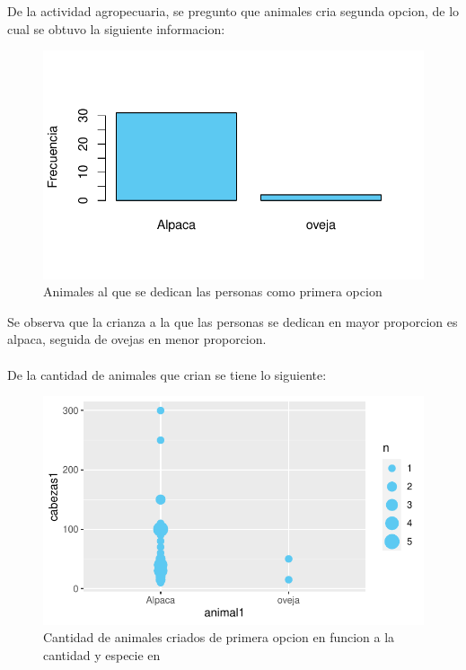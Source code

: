 \documentclass[12pt]{article}\usepackage[]{graphicx}\usepackage[]{xcolor}
\makeatletter
\def\maxwidth{ %
  \ifdim\Gin@nat@width>\linewidth
    \linewidth
  \else
    \Gin@nat@width
  \fi
}
\newenvironment{knitrout}{}{} %
\makeatother
\begin{document}
	
	De la actividad agropecuaria, se pregunto que animales cria segunda opcion, de lo cual se obtuvo la siguiente informacion:
	\begin{figure}[H]
	\centering
\begin{knitrout}
\color{fgcolor}
\includegraphics[width=\maxwidth]{figure/fifteen-1} 
\end{knitrout}
	\caption{Animales al que se dedican las personas como primera opcion}
	\end{figure}
	Se observa que la crianza a la que las personas se dedican en mayor proporcion es alpaca, seguida de ovejas en menor proporcion.\\
	\\
	De la cantidad de animales que crian se tiene lo siguiente:
	\begin{figure}[H]
	\centering
\begin{knitrout}
\color{fgcolor}
\includegraphics[width=\maxwidth]{figure/sixteen-1} 
\end{knitrout}
	\caption{Cantidad de animales criados de primera opcion en funcion a la cantidad y especie en \comunidad}
	\end{figure}
	
\end{document}
